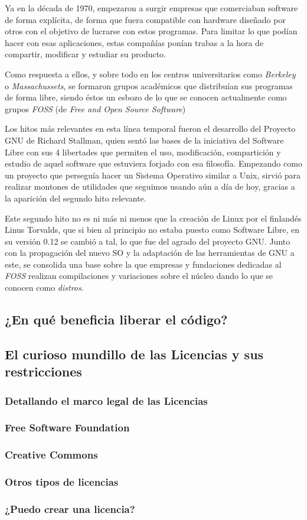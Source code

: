 Ya en la década de 1970, empezaron a surgir empresas que comerciaban software de forma explícita, de forma que fuera compatible con hardware diseñado por otros con el objetivo de lucrarse con estos programas. Para limitar lo que podían hacer con esas aplicaciones, estas compañías ponían trabas a la hora de compartir, modificar y estudiar su producto.

Como respuesta a ellos, y sobre todo en los centros universitarios como \textit{Berkeley} o \textit{Massachussets}, se formaron grupos académicos que distribuían sus programas de forma libre, siendo éstos un esbozo de lo que se conocen actualmente como grupos \textit{FOSS} (de \textit{Free and Open Source Software}) 

Los hitos más relevantes en esta línea temporal fueron el desarrollo del Proyecto GNU de Richard Stallman, quien  sentó las bases de la iniciativa del Software Libre con sus 4 libertades que permiten el uso, modificación, compartición y estudio de aquel software que estuviera forjado con esa filosofía. Empezando como un proyecto que perseguía hacer un Sistema Operativo similar a Unix, sirvió para realizar montones de utilidades que seguimos usando aún a día de hoy, gracias a la aparición del segundo hito relevante.

Este segundo hito no es ni más ni menos que la creación de Linux por el finlandés Linus Torvalds, que si bien al principio no estaba puesto como Software Libre, en su versión 0.12 se cambió a tal, lo que fue del agrado del proyecto GNU. Junto con la propagación del nuevo SO y la adaptación de las herramientas de GNU a este, se consolida una base sobre la que empresas y fundaciones dedicadas al \textit{FOSS} realizan compilaciones y variaciones sobre el núcleo dando lo que se conocen como \textit{distros}.

\subsection{¿En qué beneficia liberar el código?}

\subsection{El curioso mundillo de las Licencias y sus restricciones}

\subsubsection{Detallando el marco legal de las Licencias}

\subsubsection{Free Software Foundation}

\subsubsection{Creative Commons}

\subsubsection{Otros tipos de licencias}

\subsubsection{¿Puedo crear una licencia?}
